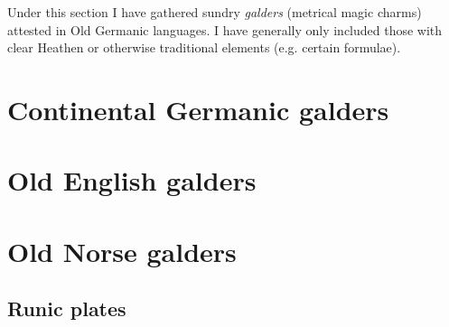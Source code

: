 Under this section I have gathered sundry \emph{galders} (metrical magic charms) attested in Old Germanic languages.  I have generally only included those with clear Heathen or otherwise traditional elements (e.g. certain formulae).


\chapter{Continental Germanic galders}





\chapter{Old English galders}

%

%






\chapter{Old Norse galders}






\section{Runic plates}

